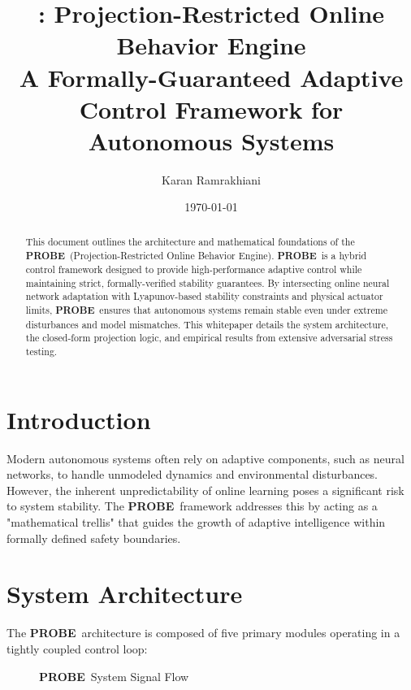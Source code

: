 \documentclass[11pt,a4paper]{article}
\title{\probe: Projection-Restricted Online Behavior Engine \\ \large A Formally-Guaranteed Adaptive Control Framework for Autonomous Systems}
\author{Karan Ramrakhiani}
\date{\today}
\newcommand{\probe}{\textbf{PROBE}}
\begin{document}
\maketitle

\begin{abstract}
This document outlines the architecture and mathematical foundations of the \probe\ (Projection-Restricted Online Behavior Engine). \probe\ is a hybrid control framework designed to provide high-performance adaptive control while maintaining strict, formally-verified stability guarantees. By intersecting online neural network adaptation with Lyapunov-based stability constraints and physical actuator limits, \probe\ ensures that autonomous systems remain stable even under extreme disturbances and model mismatches. This whitepaper details the system architecture, the closed-form projection logic, and empirical results from extensive adversarial stress testing.
\end{abstract}

\section{Introduction}
Modern autonomous systems often rely on adaptive components, such as neural networks, to handle unmodeled dynamics and environmental disturbances. However, the inherent unpredictability of online learning poses a significant risk to system stability. The \probe\ framework addresses this by acting as a "mathematical trellis" that guides the growth of adaptive intelligence within formally defined safety boundaries.

\section{System Architecture}
The \probe\ architecture is composed of five primary modules operating in a tightly coupled control loop:

\begin{figure}[h]
    \centering
    \caption{\probe\ System Signal Flow}
\end{figure}
\end{document}
